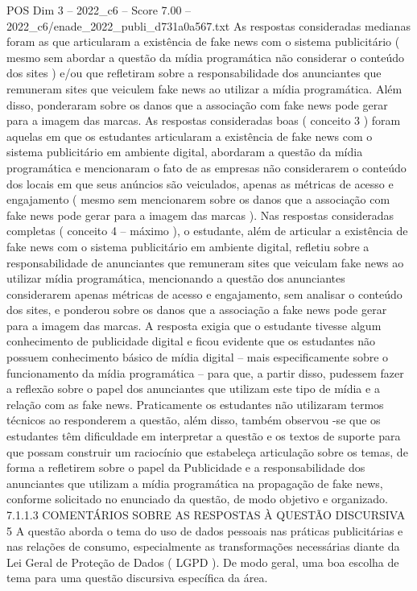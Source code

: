 \begin{textsample}{POS Dim 3 – 2022\_c6 – Score 7.00 – 2022\_c6/enade\_2022\_publi\_d731a0a567.txt}
As respostas consideradas medianas foram as que articularam a existência de fake news com o sistema publicitário ( mesmo sem abordar a questão da mídia programática não considerar o conteúdo dos sites ) e/ou que refletiram sobre a responsabilidade dos anunciantes que remuneram sites que veiculem fake news ao utilizar a mídia programática.
Além disso, ponderaram sobre os danos que a associação com fake news pode gerar para a imagem das marcas.
As respostas consideradas boas ( conceito 3 ) foram aquelas em que os estudantes articularam a existência de fake news com o sistema publicitário em ambiente digital, abordaram a questão da mídia programática e mencionaram o fato de as empresas não considerarem o conteúdo dos locais em que seus anúncios são veiculados, apenas as métricas de acesso e engajamento ( mesmo sem mencionarem sobre os danos que a associação com fake news pode gerar para a imagem das marcas ).
Nas respostas consideradas completas ( conceito 4 – máximo ), o estudante, além de articular a existência de fake news com o sistema publicitário em ambiente digital, refletiu sobre a responsabilidade de anunciantes que remuneram sites que veiculam fake news ao utilizar mídia programática, mencionando a questão dos anunciantes considerarem apenas métricas de acesso e engajamento, sem analisar o conteúdo dos sites, e ponderou sobre os danos que a associação a fake news pode gerar para a imagem das marcas.
A resposta exigia que o estudante tivesse algum conhecimento de publicidade digital e ficou evidente que os estudantes não possuem conhecimento básico de mídia digital – mais especificamente sobre o funcionamento da mídia programática – para que, a partir disso, pudessem fazer a reflexão sobre o papel dos anunciantes que utilizam este tipo de mídia e a relação com as fake news.
Praticamente os estudantes não utilizaram termos técnicos ao responderem a questão, além disso, também observou -se que os estudantes têm dificuldade em interpretar a questão e os textos de suporte para que possam construir um raciocínio que estabeleça articulação sobre os temas, de forma a refletirem sobre o papel da Publicidade e a responsabilidade dos anunciantes que utilizam a mídia programática na propagação de fake news, conforme solicitado no enunciado da questão, de modo objetivo e organizado. 7.1.1.3 COMENTÁRIOS SOBRE AS RESPOSTAS À QUESTÃO DISCURSIVA 5 A questão aborda o tema do uso de dados pessoais nas práticas publicitárias e nas relações de consumo, especialmente as transformações necessárias diante da Lei Geral de Proteção de Dados ( LGPD ).
De modo geral, uma boa escolha de tema para uma questão discursiva específica da área.

\end{textsample}
